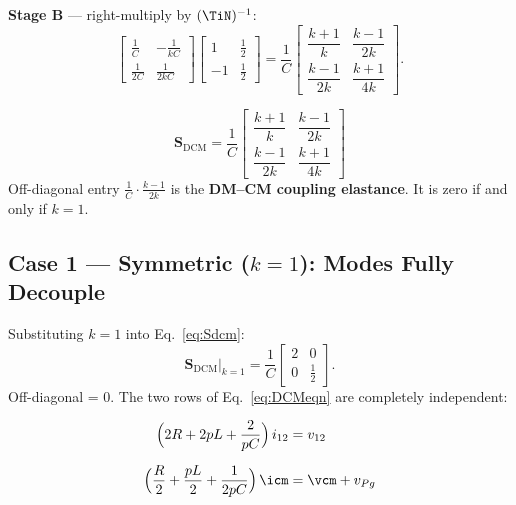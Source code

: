 \textbf{Stage B} — right-multiply by $(\TiN)^{-1}$:
\[
\begin{bmatrix}
    \tfrac{1}{C}  & -\tfrac{1}{kC} \\[6pt]
    \tfrac{1}{2C} & \tfrac{1}{2kC}
\end{bmatrix}
\begin{bmatrix}1 & \tfrac{1}{2} \\[3pt] -1 & \tfrac{1}{2}\end{bmatrix}
=
\frac{1}{C}
\begin{bmatrix}
    \dfrac{k+1}{k}  & \dfrac{k-1}{2k}  \\[10pt]
    \dfrac{k-1}{2k} & \dfrac{k+1}{4k}
\end{bmatrix}.
\]

\begin{eqnbox}[DCM Elastance Matrix ($N = 2$) — Eq.~16 in paper]
\begin{equation}
\mathbf{S}_{\mathrm{DCM}}
= \frac{1}{C}
  \begin{bmatrix}
      \dfrac{k+1}{k}  & \dfrac{k-1}{2k}  \\[10pt]
      \dfrac{k-1}{2k} & \dfrac{k+1}{4k}
  \end{bmatrix}
\label{eq:Sdcm}
\end{equation}
Off-diagonal entry $\tfrac{1}{C}\cdot\tfrac{k-1}{2k}$ is the
\textbf{DM--CM coupling elastance}.
It is zero if and only if $k = 1$.
\end{eqnbox}

\subsection{Case 1 — Symmetric ($k = 1$): Modes Fully Decouple}

Substituting $k = 1$ into Eq.~\eqref{eq:Sdcm}:
\[
\mathbf{S}_{\mathrm{DCM}}\big|_{k=1}
=
\frac{1}{C}\begin{bmatrix}2 & 0 \\ 0 & \tfrac{1}{2}\end{bmatrix}.
\]
Off-diagonal = 0.  The two rows of Eq.~\eqref{eq:DCMeqn} are
completely independent:

\begin{eqnbox}
\begin{align}
    \Bigl(2R + 2pL + \frac{2}{pC}\Bigr)\,i_{12}
        &= v_{12}
        \label{eq:DM_sym} \\[6pt]
    \Bigl(\frac{R}{2} + \frac{pL}{2} + \frac{1}{2pC}\Bigr)\,\icm
        &= \vcm + v_{Pg}
        \label{eq:CM_sym}
\end{align}
\end{eqnbox}

